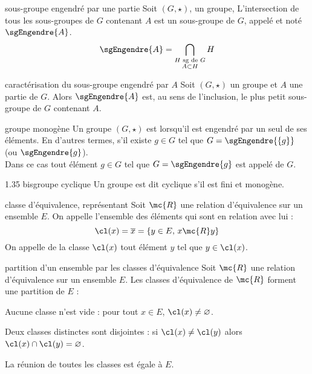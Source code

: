 

\begin{adjustwidth}{-3cm}{-3cm}


\begin{definition}{1.32}{sous-groupe engendré par une partie}
    Soit $(G,\star)$, un groupe, L’intersection de tous les sous-groupes de $G$ contenant $A$ est un sous-groupe de $G$, appelé  et noté $\sgEngendre{A}$.
    $$\sgEngendre{A} = \bigcap_{\substack{H \text{ sg de } G \\ A \subset H}} H$$
\end{definition}


\begin{proposition}{1.33}{caractérisation du sous-groupe engendré par $A$}
    Soit $(G, \star)$ un groupe et $A$ une partie de $G$. Alors $\sgEngendre{A}$ est, au sens de l’inclusion, le plus petit sous-groupe de $G$ contenant $A$.
\end{proposition}

\begin{definition}{1.35}{groupe monogène}
    Un groupe $(G, \star)$ est  lorsqu’il est engendré par un seul de ses éléments. En d’autres termes, s'il existe $g \in G$ tel que $ G = \sgEngendre{\{g\}}$ (ou $\sgEngendre{g}$).\\
Dans ce cas tout élément $g \in G$ tel que $G = \sgEngendre{g}$ est appelé  de $G$.
\end{definition}

\begin{definition}{1.35 bis}{groupe cyclique}
    Un groupe est dit cyclique s'il est fini et monogène.
\end{definition}

\begin{definition}{1.59}{classe d'équivalence, représentant}
    Soit $\mc{R}$ une relation d'équivalence sur un ensemble $E$. On appelle  l’ensemble des éléments qui sont en relation avec lui :
    $$\cl(x) = \overline{x} = \{y \in E,\, x \mc{R} y\}$$
On appelle  de la classe $\cl(x)$ tout élément $y$ tel que $y \in \cl(x)$.
\end{definition}

\begin{theoreme}{1.61}{partition d'un ensemble par les classes d'équivalence}
    Soit $\mc{R}$ une relation d'équivalence sur un ensemble $E$. Les classes d’équivalence de $\mc{R}$ forment une partition de $E$ :
    \begin{enumeratebf}
        \item Aucune classe n’est vide : pour tout $x\in E$, $\cl(x) \neq \varnothing$.
        \item Deux classes distinctes sont disjointes : si $\cl(x) \neq \cl(y)$ alors $\cl(x) \cap \cl(y) = \varnothing$.
        \item La réunion de toutes les classes est égale à $E$.
    \end{enumeratebf}
\end{theoreme}


\end{adjustwidth}

